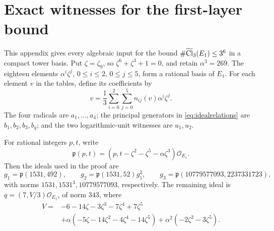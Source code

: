 \documentclass[11pt]{article}
\theoremstyle{remark}\newtheorem{remark}[theorem]{Remark}
\newcommand{\Oa}{\mathcal O}\newcommand{\Cl}{\operatorname{Cl}}
\begin{document}
\appendix
\section{Exact witnesses for the first-layer bound}
\label{app:witnesses}
This appendix gives every algebraic input for the bound $\#\lc(E_1)\leq3^6$ in a compact tower basis.
Put $\zeta=\zeta_9$, so $\zeta^6+\zeta^3+1=0$, and retain $\alpha^3=269$.
The eighteen elements $\alpha^i\zeta^j$, $0\leq i\leq2$, $0\leq j\leq5$, form a rational basis of $E_1$.
For each element $v$ in the tables, define its coefficients by
\begin{equation}
 v=\frac13\sum_{i=0}^2\sum_{j=0}^5 n_{ij}(v)\alpha^i\zeta^j.
 \label{eq:towercoordinates}
\end{equation}
The four radicals are $a_1,\ldots,a_4$; the principal generators in \eqref{eq:idealrelations} are $b_1,b_2,b_3,b_q$; and the two logarithmic-unit witnesses are $u_1,u_2$.

For rational integers $p,t$, write
\[
 \mathfrak p(p,t)=(p,t-\zeta^2-\zeta^5-\alpha\zeta^3)\Oa_{E_1}.
\]
Then the ideals used in the proof are
\[
 g_1=\mathfrak p(1531,492),\qquad
 g_2=\mathfrak p(1531,52)g_1^2,\qquad
 g_3=\mathfrak p(10779577093,2237331723),
\]
with norms $1531,1531^3,10779577093$, respectively.
The remaining ideal is $q=(7,V/3)\Oa_{E_1}$, of norm $343$, where
\begin{align*}
V={}&-6-14\zeta-3\zeta^3-7\zeta^4+7\zeta^5\\
 &+\alpha(-5\zeta-14\zeta^2-4\zeta^4-14\zeta^5)
 +\alpha^2(-2\zeta^2-3\zeta^5).
\end{align*}

\end{document}
